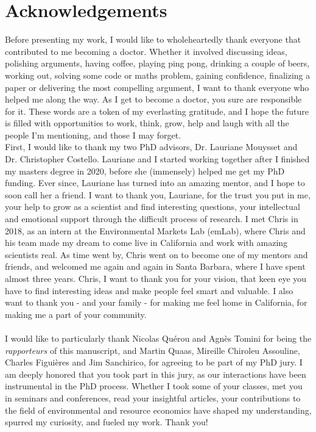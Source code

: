 \chapter*{Acknowledgements}
\onehalfspacing

Before presenting my work, I would like to wholeheartedly thank everyone that contributed to me becoming a doctor. Whether it involved discussing ideas, polishing arguments, having coffee, playing ping pong, drinking a couple of beers, working out, solving some code or maths problem, gaining confidence, finalizing a paper or delivering the most compelling argument, I want to thank everyone who helped me along the way. As I get to become a doctor, you sure are responsible for it. These words are a token of my everlasting gratitude, and I hope the future is filled with opportunities to work, think, grow, help and laugh with all the people I'm mentioning, and those I may forget. 
\\

First, I would like to thank my two PhD advisors, Dr. Lauriane Mouysset and Dr. Christopher Costello. Lauriane and I started working together after I finished my masters degree in 2020, before she (immensely) helped me get my PhD funding. Ever since, Lauriane has turned into an amazing mentor, and I hope to soon call her a friend. I want to thank you, Lauriane, for the trust you put in me, your help to grow as a scientist and find interesting questions, your intellectual and emotional support through the difficult process of research. 
%
I met Chris in 2018, as an intern at the Environmental Markets Lab (emLab), where Chris and his team made my dream to come live in California and work with amazing scientists real. As time went by, Chris went on to become one of my mentors and friends, and welcomed me again and again in Santa Barbara, where I have spent almost three years. Chris, I want to thank you for your vision, that keen eye you have to find interesting ideas and make people feel smart and valuable. I also want to thank you - and your family - for making me feel home in California, for making me a part of your community.
\\\\
I would like to particularly thank Nicolas Quérou and Agnès Tomini for being the \textit{rapporteurs} of this manuscript, and Martin Quaas, Mireille Chiroleu Assouline, Charles Figuières and Jim Sanchirico, for agreeing to be part of my PhD jury. I am deeply honored that you took part in this jury, as our interactions have been instrumental in the PhD process. Whether I took some of your classes, met you in seminars and conferences, read your insightful articles, your contributions to the field of environmental and resource economics have shaped my understanding, spurred my curiosity, and fueled my work. Thank you!
\\\\

